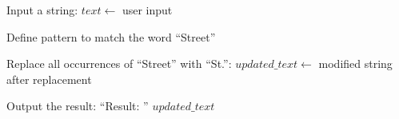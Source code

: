 \begin{algorithm}
\caption{Abbreviate "Street" to "St." in a Given String}
\begin{algorithmic}[1]

\STATE Input a string:
\STATE $text \gets$ user input

\STATE Define pattern to match the word ``Street''

\STATE Replace all occurrences of ``Street'' with ``St.'':
\STATE $updated\_text \gets$ modified string after replacement

\STATE Output the result:
\STATE ``Result: '' $updated\_text$

\end{algorithmic}
\end{algorithm}